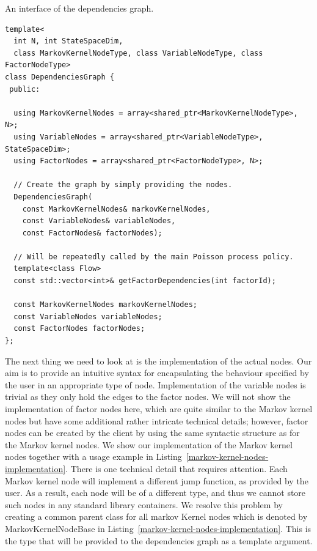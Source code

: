 \documentclass[report.tex]{subfiles}
\begin{document}
\begin{lstfloat}
\caption{An interface of the dependencies graph.}
\label{listing-dependencies-graph}
\begin{lstlisting}
template<
  int N, int StateSpaceDim,
  class MarkovKernelNodeType, class VariableNodeType, class FactorNodeType>
class DependenciesGraph {
 public:

  using MarkovKernelNodes = array<shared_ptr<MarkovKernelNodeType>, N>;
  using VariableNodes = array<shared_ptr<VariableNodeType>, StateSpaceDim>;
  using FactorNodes = array<shared_ptr<FactorNodeType>, N>;

  // Create the graph by simply providing the nodes.
  DependenciesGraph(
    const MarkovKernelNodes& markovKernelNodes,
    const VariableNodes& variableNodes,
    const FactorNodes& factorNodes);

  // Will be repeatedly called by the main Poisson process policy.
  template<class Flow>
  const std::vector<int>& getFactorDependencies(int factorId);

  const MarkovKernelNodes markovKernelNodes;
  const VariableNodes variableNodes;
  const FactorNodes factorNodes;
};
\end{lstlisting}
\end{lstfloat}

The next thing we need to look at is the implementation of the actual nodes.
Our aim is to provide an intuitive syntax for encapsulating the behaviour specified by the user
in an appropriate type of node.
Implementation of the variable nodes is trivial as they only hold the
edges to the factor nodes.
We will not show the implementation of factor nodes here, which are quite
similar to the Markov kernel nodes but have some additional rather intricate technical details;
however, factor nodes can be created by the client by using the same syntactic structure as
for the Markov kernel nodes.
We show our implementation of the Markov kernel nodes together with a usage example
in Listing~\ref{markov-kernel-nodes-implementation}.
There is one technical detail that requires attention.
Each Markov kernel node will implement a different jump function, as provided by
the user. As a result, each node will be of a different type, and thus we cannot
store such nodes in any standard library containers.
We resolve this problem by creating a common parent class for all markov
Kernel nodes which is denoted by MarkovKernelNodeBase in Listing~\ref{markov-kernel-nodes-implementation}.
This is the type that will be provided to the dependencies graph as a template argument.
\end{document}
